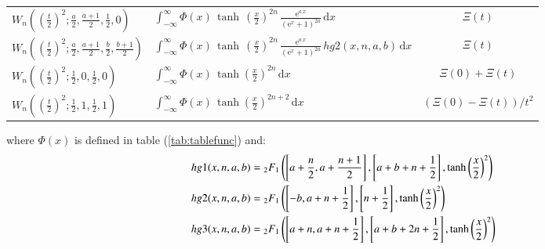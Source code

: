 \documentclass[a4paper,11pt,twoside]{amsart}
\newcommand{\defeq}{=}
\newcommand{\defeq}{\stackrel{\scriptscriptstyle \textnormal{def}}{=}}
\begin{document}
{\begin{minipage}{\textwidth}
\begin{table}[H]
\begin{center}
\begin{tabular}{l|l|c|}
      $W_{n}\left(\left(\frac{t}{2}\right)^2;\frac{a}{2},\frac{a+1}{2},\frac12,0\right) $ & $\displaystyle \int_{-\infty}^{\infty} \Phi(x)\,\tanh\,\left(\frac{x}{2}\right)^{2n}\,\frac{\textrm{e}^{a\,x}}{(\textrm{e}^x+1)^{2a}}\,\mathrm{d}x$ &$\Xi(t)$ \\
      $W_{n}\left(\left(\frac{t}{2}\right)^2;\frac{a}{2},\frac{a+1}{2},\frac{b}{2},\frac{b+1}{2}\right)$ & $\displaystyle \int_{-\infty}^{\infty} \Phi(x)\,\tanh\,\left(\frac{x}{2}\right)^{2n}\,\frac{\textrm{e}^{a\,x}}{(\textrm{e}^x+1)^{2a}} \,hg2(x,n,a,b) \,\mathrm{d}x$ &$\Xi(t)$ \\
      $W_n\left(\left(\frac{t}{2}\right)^2;\frac12,0,\frac12,0\right)$ & $\displaystyle \int_{-\infty}^\infty \Phi(x)\,\tanh\left(\frac{x}{2}\right)^{2n}\, \mathrm{d}x $  &$\Xi(0) + \Xi(t)$ \\    
      $W_n\left(\left(\frac{t}{2}\right)^2;\frac12,1,\frac12,1\right)$ & $\displaystyle \int_{-\infty}^\infty \Phi(x)\,\tanh\left(\frac{x}{2}\right)^{2n+2}\, \mathrm{d}x $  &$\left(\Xi(0)-\Xi(t)\right)/t^2 $ \\       
    \end{tabular}
  \end{center}
\end{table}
where $\Phi(x)$ is defined in table (\ref{tab:tablefunc}) and:
\begin{align}
 hg1(x,n,a,b) &\defeq {}_2F_1\left(\left[a+\frac{n}{2}, a+\frac{n+1}{2}\right],\left[a+b+n+\frac12\right],\tanh\left(\frac{x}{2}\right)^2\right) \notag \\
 hg2(x,n,a,b) &\defeq {}_2F_1\left(\left[-b, a+n+\frac12\right],\left[n+\frac12\right],\tanh\left(\frac{x}{2}\right)^2\right) \notag \\
 hg3(x,n,a,b) &\defeq {}_2F_1\left(\left[a+n, a+n+\frac12\right],\left[a+b+2n+\frac12\right],\tanh\left(\frac{x}{2}\right)^2\right) \notag
\end{align} 
\end{minipage}}
\end{document}

